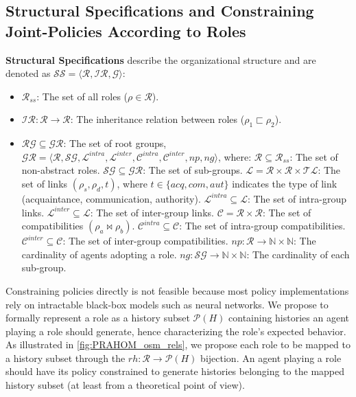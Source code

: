 \documentclass[sigconf,anonymous]{aamas}
\begin{document}
\subsection{Structural Specifications and Constraining Joint-Policies According to Roles}

\textbf{Structural Specifications} describe the organizational structure and are denoted as $\mathcal{SS} = \langle \mathcal{R}, \mathcal{IR}, \mathcal{G} \rangle$:

\begin{itemize}
    \item $\mathcal{R}_{ss}$: The set of all roles ($\rho \in \mathcal{R}$).
    \item $\mathcal{IR}: \mathcal{R} \rightarrow \mathcal{R}$: The inheritance relation between roles ($\rho_1 \sqsubset \rho_2$).
    \item $\mathcal{RG} \subseteq \mathcal{GR}$: The set of root groups, $\mathcal{GR} = \langle \mathcal{R}, \mathcal{SG}, \mathcal{L}^{intra}, \mathcal{L}^{inter}, \mathcal{C}^{intra}, \mathcal{C}^{inter}, \allowbreak np, ng \rangle$, where:
          $\mathcal{R} \subseteq \mathcal{R}_{ss}$: The set of non-abstract roles.
          $\mathcal{SG} \subseteq \mathcal{GR}$: The set of sub-groups.
          $\mathcal{L} = \mathcal{R} \times \mathcal{R} \times \mathcal{TL}$: The set of links $(\rho_s, \rho_d, t)$, where $t \in \{acq, com, aut\}$ indicates the type of link (acquaintance, communication, authority).
          $\mathcal{L}^{intra} \subseteq \mathcal{L}$: The set of intra-group links.
          $\mathcal{L}^{inter} \subseteq \mathcal{L}$: The set of inter-group links.
          $\mathcal{C} = \mathcal{R} \times \mathcal{R}$: The set of compatibilities $(\rho_a \bowtie \rho_b)$.
          $\mathcal{C}^{intra} \subseteq \mathcal{C}$: The set of intra-group compatibilities.
          $\mathcal{C}^{inter} \subseteq \mathcal{C}$: The set of inter-group compatibilities.
          $np: \mathcal{R} \rightarrow \mathbb{N} \times \mathbb{N}$: The cardinality of agents adopting a role.
          $ng: \mathcal{SG} \rightarrow \mathbb{N} \times \mathbb{N}$: The cardinality of each sub-group.
\end{itemize}

Constraining policies directly is not feasible because most policy implementations rely on intractable black-box models such as neural networks. We propose to formally represent a role as a history subset $\mathcal{P}(H)$ containing histories an agent playing a role should generate, hence characterizing the role's expected behavior. As illustrated in \autoref{fig:PRAHOM_osm_rels}, we propose each role to be mapped to a history subset through the $rh: \mathcal{R} \rightarrow \mathcal{P}(H)$ bijection. An agent playing a role should have its policy constrained to generate histories belonging to the mapped history subset (at least from a theoretical point of view).
\end{document}
